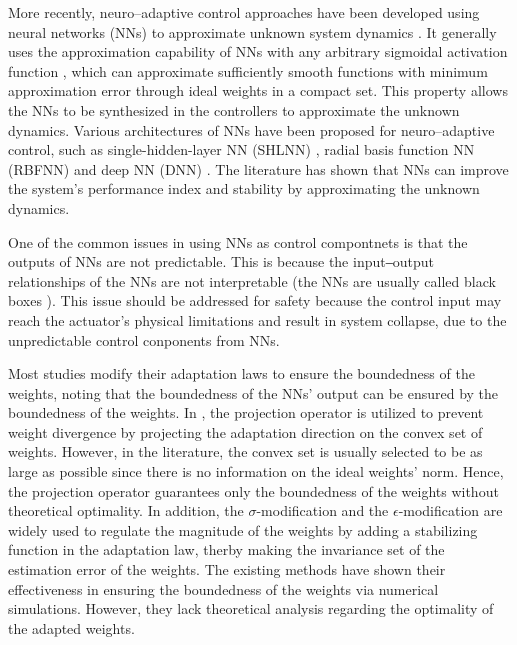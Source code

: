 \documentclass[letterpaper, 10 pt, conference]{ieeeconf}  %
\begin{document}
More recently, neuro–adaptive control approaches have been developed using neural networks (NNs) to approximate unknown system dynamics \cite{Farrell:2006aa}.
It generally uses the approximation capability of NNs with any arbitrary sigmoidal activation function \cite{Cybenko:1989aa}, which can approximate sufficiently smooth functions with minimum approximation error through ideal weights in a compact set.
This property allows the NNs to be synthesized in the controllers to approximate the unknown dynamics.
Various architectures of NNs have been proposed for neuro–adaptive control, such as single-hidden-layer NN (SHLNN) \cite{Esfandiari:2015aa,Gao:2006aa}, radial basis function NN (RBFNN) \cite{Ge:2002aa,Zhou:2023aa} and deep NN (DNN) \cite{Patil:2022aa}.
The literature has shown that NNs can improve the system's performance index and stability by approximating the unknown dynamics.


One of the common issues in using NNs as control compontnets is that the outputs of NNs are not predictable.
This is because the input‒output relationships of the NNs are not interpretable (\ie the NNs are usually called black boxes \cite{Sheu:2020aa,Rudin:2019aa}).
This issue should be addressed for safety because the control input may reach the actuator's physical limitations and result in system collapse, due to the unpredictable control conponents from NNs.

Most studies modify their adaptation laws to ensure the boundedness of the weights, noting that the boundedness of the NNs' output can be ensured by the boundedness of the weights.
In \cite{Zhou:2023aa,Patil:2022aa}, the projection operator is utilized to prevent weight divergence by projecting the adaptation direction on the convex set of weights.
However, in the literature, the convex set is usually selected to be as large as possible since there is no information on the ideal weights' norm.
Hence, the projection operator guarantees only the boundedness of the weights without theoretical optimality.
In addition, the $\sigma$-modification\cite{Ge:2002aa} and the $\epsilon$-modification \cite{Esfandiari:2015aa,Gao:2006aa} are widely used to regulate the magnitude of the weights by adding a stabilizing function in the adaptation law, therby making the invariance set of the estimation error of the weights. 
The existing methods have shown their effectiveness in ensuring the boundedness of the weights via numerical simulations.
However, they lack theoretical analysis regarding the optimality of the adapted weights.
\end{document}
